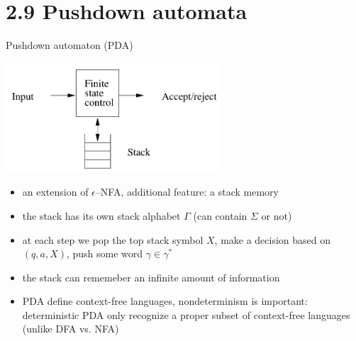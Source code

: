 \documentclass[handout]{beamer}
\begin{document}
\section{2.9 Pushdown automata}


\begin{frame}{Pushdown automaton (PDA)}

    \vspace{-6pt}
    \begin{center}
        \includegraphics[width=0.6\textwidth]{files/pushDown.PNG}
    \end{center}
    \vspace{-12pt}

    \begin{itemize}
        \item an extension of $\epsilon$--NFA, additional feature: a \alert{stack} memory %
        \item the stack has its own \alert{stack alphabet} $\Gamma$ (can contain $\Sigma$ or not)
        \item at each step we pop the top stack symbol $X$, make a decision based on $(q,a,X)$, push some word $\gamma\in\gamma^*$
        \item the stack can rememeber an infinite amount of information
        \item PDA define context-free languages, nondeterminism is important: \alert{deterministic} PDA only recognize a proper subset of context-free languages (unlike DFA vs. NFA)
    \end{itemize}
    
\end{frame}
\end{document}
